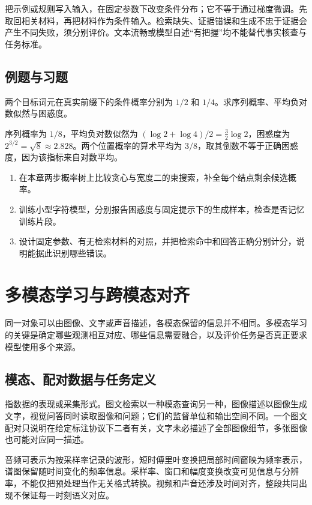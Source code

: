 \documentclass[UTF8,12pt,a4paper,fontset=fandol]{ctexbook}
\begin{document}
把示例或规则写入输入，在固定参数下改变条件分布；它不等于通过梯度微调。先取回相关材料，再把材料作为条件输入。检索缺失、证据错误和生成不忠于证据会产生不同失败，须分别评价。文本流畅或模型自述“有把握”均不能替代事实核查与任务标准。

\section{例题与习题}
\begin{example}[计算词元困惑度]
两个目标词元在真实前缀下的条件概率分别为 $1/2$ 和 $1/4$。求序列概率、平均负对数似然与困惑度。
\end{example}
\begin{solve}
序列概率为 $1/8$，平均负对数似然为 $(\log2+\log4)/2=\frac32\log2$，困惑度为 $2^{3/2}=\sqrt8\approx2.828$。两个位置概率的算术平均为 $3/8$，取其倒数不等于正确困惑度，因为该指标来自对数平均。
\end{solve}
\begin{enumerate}
\item 在本章两步概率树上比较贪心与宽度二的束搜索，补全每个结点剩余候选概率。
\item 训练小型字符模型，分别报告困惑度与固定提示下的生成样本，检查是否记忆训练片段。
\item 设计固定参数、有无检索材料的对照，并把检索命中和回答正确分别计分，说明能据此识别哪些错误。
\end{enumerate}

\chapter{多模态学习与跨模态对齐}
\label{chap:dl-multimodal}
同一对象可以由图像、文字或声音描述，各模态保留的信息并不相同。多模态学习的关键是确定哪些观测相互对应、哪些信息需要融合，以及评价任务是否真正要求模型使用多个来源。

\section{模态、配对数据与任务定义}
指数据的表现或采集形式。图文检索以一种模态查询另一种，图像描述以图像生成文字，视觉问答同时读取图像和问题；它们的监督单位和输出空间不同。一个图文配对只说明在给定标注协议下二者有关，文字未必描述了全部图像细节，多张图像也可能对应同一描述。

音频可表示为按采样率记录的波形，短时傅里叶变换把局部时间窗映为频率表示，谱图保留随时间变化的频率信息。采样率、窗口和幅度变换改变可见信息与分辨率，不能仅把预处理当作无关格式转换。视频和声音还涉及时间对齐，整段共同出现不保证每一时刻语义对应。
\end{document}
